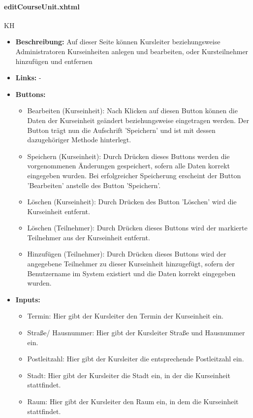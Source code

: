 				\paragraph{editCourseUnit.xhtml}
					KH\\
					\begin{itemize}
						\item \textbf{Beschreibung:} Auf dieser Seite können Kursleiter beziehungsweise Administratoren Kurseinheiten anlegen und bearbeiten, oder Kursteilnehmer hinzufügen und entfernen
						\item \textbf{Links:} -
						\item \textbf{Buttons:}
							\begin{itemize}
								\item Bearbeiten (Kurseinheit): Nach Klicken auf diesen Button können die Daten der Kurseinheit geändert beziehungsweise eingetragen werden. Der Button trägt nun die Aufschrift 'Speichern' und ist mit dessen dazugehöriger Methode hinterlegt.
								\item Speichern (Kurseinheit): Durch Drücken dieses Buttons werden die vorgenommenen Änderungen gespeichert, sofern alle Daten korrekt eingegeben wurden. Bei erfolgreicher Speicherung erscheint der Button 'Bearbeiten' anstelle des Button 'Speichern'.
								\item Löschen (Kurseinheit): Durch Drücken des Button 'Löschen' wird die Kurseinheit entfernt.
								\item Löschen (Teilnehmer): Durch Drücken dieses Buttons wird der markierte Teilnehmer aus der Kurseinheit entfernt.
								\item Hinzufügen (Teilnehmer): Durch Drücken dieses Buttons wird der angegebene Teilnehmer zu dieser Kurseinheit hinzugefügt, sofern der Benutzername im System existiert und die Daten korrekt eingegeben wurden.
							\end{itemize}
						\item \textbf{Inputs:}
							\begin{itemize}
								\item Termin: Hier gibt der Kursleiter den Termin der Kurseinheit ein.
								\item Straße/ Hausnummer: Hier gibt der Kursleiter Straße und Hausnummer ein.
								\item Postleitzahl: Hier gibt der Kursleiter die entsprechende Postleitzahl ein.
								\item Stadt: Hier gibt der Kursleiter die Stadt ein, in der die Kurseinheit stattfindet.
								\item Raum: Hier gibt der Kursleiter den Raum ein, in dem die Kurseinheit stattfindet.

\end{itemize}
\end{itemize}
